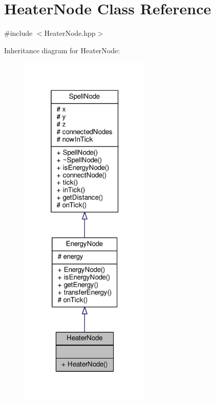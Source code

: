 \hypertarget{class_heater_node}{\section{Heater\-Node Class Reference}
\label{class_heater_node}
}


{\ttfamily \#include $<$Heater\-Node.\-hpp$>$}



Inheritance diagram for Heater\-Node\-:
\nopagebreak
\begin{figure}[H]
\begin{center}
\leavevmode
\includegraphics[width=176pt]{class_heater_node__inherit__graph}
\end{center}
\end{figure}


